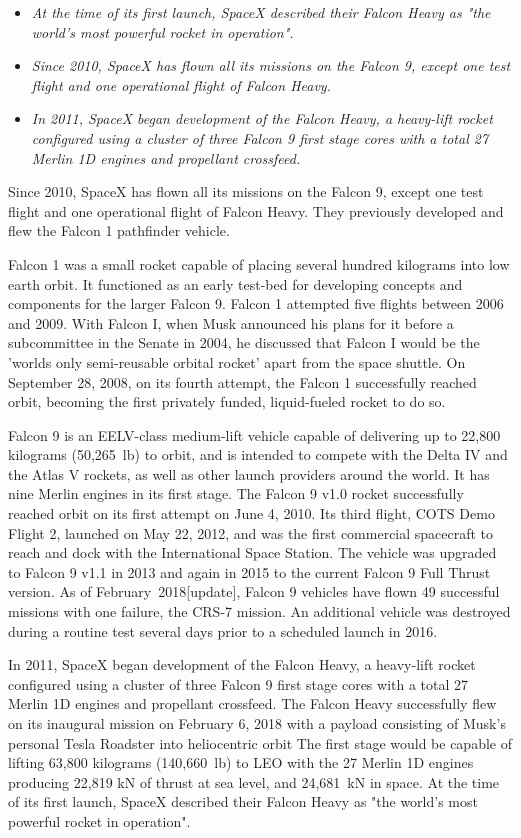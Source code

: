 \begin{itemize}
\item
  \emph{At the time of its first launch, SpaceX described their Falcon
  Heavy as "the world's most powerful rocket in operation".}
\item
  \emph{Since 2010, SpaceX has flown all its missions on the Falcon 9,
  except one test flight and one operational flight of Falcon Heavy.}
\item
  \emph{In 2011, SpaceX began development of the Falcon Heavy, a
  heavy-lift rocket configured using a cluster of three Falcon 9 first
  stage cores with a total 27 Merlin 1D engines and propellant
  crossfeed.}
\end{itemize}

Since 2010, SpaceX has flown all its missions on the Falcon 9, except
one test flight and one operational flight of Falcon Heavy. They
previously developed and flew the Falcon 1 pathfinder vehicle.

Falcon 1 was a small rocket capable of placing several hundred kilograms
into low earth orbit. It functioned as an early test-bed for developing
concepts and components for the larger Falcon 9. Falcon 1 attempted five
flights between 2006 and 2009. With Falcon I, when Musk announced his
plans for it before a subcommittee in the Senate in 2004, he discussed
that Falcon I would be the 'worlds only semi-reusable orbital rocket'
apart from the space shuttle. On September 28, 2008, on its fourth
attempt, the Falcon 1 successfully reached orbit, becoming the first
privately funded, liquid-fueled rocket to do so.

Falcon 9 is an EELV-class medium-lift vehicle capable of delivering up
to 22,800 kilograms (50,265~lb) to orbit, and is intended to compete
with the Delta IV and the Atlas V rockets, as well as other launch
providers around the world. It has nine Merlin engines in its first
stage. The Falcon 9 v1.0 rocket successfully reached orbit on its first
attempt on June 4, 2010. Its third flight, COTS Demo Flight 2, launched
on May 22, 2012, and was the first commercial spacecraft to reach and
dock with the International Space Station. The vehicle was upgraded to
Falcon 9 v1.1 in 2013 and again in 2015 to the current Falcon 9 Full
Thrust version. As of February~2018{[}update{]}, Falcon 9 vehicles have
flown 49 successful missions with one failure, the CRS-7 mission. An
additional vehicle was destroyed during a routine test several days
prior to a scheduled launch in 2016.

In 2011, SpaceX began development of the Falcon Heavy, a heavy-lift
rocket configured using a cluster of three Falcon 9 first stage cores
with a total 27 Merlin 1D engines and propellant crossfeed. The Falcon
Heavy successfully flew on its inaugural mission on February 6, 2018
with a payload consisting of Musk's personal Tesla Roadster into
heliocentric orbit The first stage would be capable of lifting 63,800
kilograms (140,660~lb) to LEO with the 27 Merlin 1D engines producing
22,819 kN of thrust at sea level, and 24,681~kN in space. At the time of
its first launch, SpaceX described their Falcon Heavy as "the world's
most powerful rocket in operation".

